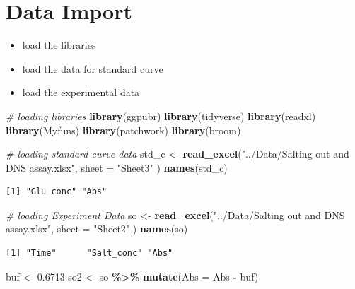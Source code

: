 \documentclass[
  12pt,
]{article}
\newenvironment{Shaded}{\begin{snugshade}}{\end{snugshade}}
\newcommand{\AttributeTok}[1]{\textcolor[rgb]{0.13,0.29,0.53}{#1}}
\newcommand{\CommentTok}[1]{\textcolor[rgb]{0.56,0.35,0.01}{\textit{#1}}}
\newcommand{\FloatTok}[1]{\textcolor[rgb]{0.00,0.00,0.81}{#1}}
\newcommand{\FunctionTok}[1]{\textcolor[rgb]{0.13,0.29,0.53}{\textbf{#1}}}
\newcommand{\NormalTok}[1]{#1}
\newcommand{\OtherTok}[1]{\textcolor[rgb]{0.56,0.35,0.01}{#1}}
\newcommand{\SpecialCharTok}[1]{\textcolor[rgb]{0.81,0.36,0.00}{\textbf{#1}}}
\newcommand{\StringTok}[1]{\textcolor[rgb]{0.31,0.60,0.02}{#1}}
\providecommand{\tightlist}{%
  \setlength{\itemsep}{0pt}\setlength{\parskip}{0pt}}
\begin{document}
\section{Data Import}\label{data-import}

\begin{itemize}
\tightlist
\item
  load the libraries
\item
  load the data for standard curve
\item
  load the experimental data
\end{itemize}

\begin{Shaded}
\begin{Highlighting}[]
\CommentTok{\# loading libraries}
\FunctionTok{library}\NormalTok{(ggpubr)}
\FunctionTok{library}\NormalTok{(tidyverse)}
\FunctionTok{library}\NormalTok{(readxl)}
\FunctionTok{library}\NormalTok{(Myfuns)}
\FunctionTok{library}\NormalTok{(patchwork)}
\FunctionTok{library}\NormalTok{(broom)}

\CommentTok{\# loading standard curve data}
\NormalTok{std\_c }\OtherTok{\textless{}{-}} \FunctionTok{read\_excel}\NormalTok{(}\StringTok{"../Data/Salting out and DNS assay.xlsx"}\NormalTok{,}
  \AttributeTok{sheet =} \StringTok{"Sheet3"}
\NormalTok{)}
\FunctionTok{names}\NormalTok{(std\_c)}
\end{Highlighting}
\end{Shaded}

\begin{verbatim}
[1] "Glu_conc" "Abs"     
\end{verbatim}

\begin{Shaded}
\begin{Highlighting}[]
\CommentTok{\# loading Experiment Data}
\NormalTok{so }\OtherTok{\textless{}{-}} \FunctionTok{read\_excel}\NormalTok{(}\StringTok{"../Data/Salting out and DNS assay.xlsx"}\NormalTok{,}
  \AttributeTok{sheet =} \StringTok{"Sheet2"}
\NormalTok{)}
\FunctionTok{names}\NormalTok{(so)}
\end{Highlighting}
\end{Shaded}

\begin{verbatim}
[1] "Time"      "Salt_conc" "Abs"      
\end{verbatim}

\begin{Shaded}
\begin{Highlighting}[]
\NormalTok{buf }\OtherTok{\textless{}{-}} \FloatTok{0.6713}
\NormalTok{so2 }\OtherTok{\textless{}{-}}\NormalTok{ so }\SpecialCharTok{\%\textgreater{}\%} \FunctionTok{mutate}\NormalTok{(}\AttributeTok{Abs =}\NormalTok{ Abs }\SpecialCharTok{{-}}\NormalTok{ buf)}
\end{Highlighting}
\end{Shaded}
\end{document}
